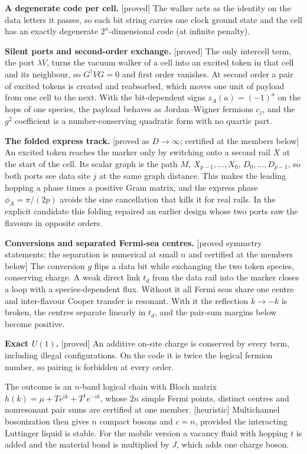 \documentclass[11pt]{article}
\newcommand{\tg}[1]{\textsf{[#1]}}
\begin{document}
\textbf{A degenerate code per cell.} \tg{proved} The walker acts as the identity on the data letters it passes, so each bit string carries one clock ground state and the cell has an exactly degenerate $2^n$-dimensional code (at infinite penalty).

\textbf{Silent ports and second-order exchange.} \tg{proved} The only intercell term, the port $\lambda V$, turns the vacuum walker of a cell into an excited token in that cell and its neighbour, so $G^\dagger V G=0$ and first order vanishes. At second order a pair of excited tokens is created and reabsorbed, which moves one unit of payload from one cell to the next. With the bit-dependent signs $z_A(a)=(-1)^a$ on the hops of one species, the payload behaves as Jordan--Wigner fermions $c_j$, and the $g^2$ coefficient is a number-conserving quadratic form with no quartic part.

\textbf{The folded express track.} \tg{proved as $D\to\infty$; certified at the members below} An excited token reaches the marker only by switching onto a second rail $X$ at the start of the cell. Its scalar graph is the path $M$, $X_{p-1},\dots,X_0$, $D_0,\dots,D_{p-1}$, so both ports see data site $j$ at the same graph distance. This makes the leading hopping a phase times a positive Gram matrix, and the express phase $\phi_A=\pi/(2p)$ avoids the sine cancellation that kills it for real rails. In the explicit candidate this folding repaired an earlier design whose two ports saw the flavours in opposite orders.

\textbf{Conversions and separated Fermi-sea centres.} \tg{proved symmetry statements; the separation is numerical at small $n$ and certified at the members below} The conversion $g$ flips a data bit while exchanging the two token species, conserving charge. A weak direct link $t_d$ from the data rail into the marker closes a loop with a species-dependent flux. Without it all Fermi seas share one centre and inter-flavour Cooper transfer is resonant. With it the reflection $k\to-k$ is broken, the centres separate linearly in $t_d$, and the pair-sum margins below become positive.

\textbf{Exact $U(1)$.} \tg{proved} An additive on-site charge is conserved by every term, including illegal configurations. On the code it is twice the logical fermion number, so pairing is forbidden at every order.

The outcome is an $n$-band logical chain with Bloch matrix $h(k)=\mu+Te^{ik}+T^\dagger e^{-ik}$, whose $2n$ simple Fermi points, distinct centres and nonresonant pair sums are certified at one member. \tg{heuristic} Multichannel bosonization \cite{giamarchi2004} then gives $n$ compact bosons and $c=n$, provided the interacting Luttinger liquid is stable. For the mobile version a vacancy fluid with hopping $t$ is added and the material bond is multiplied by $J$, which adds one charge boson.
\end{document}
